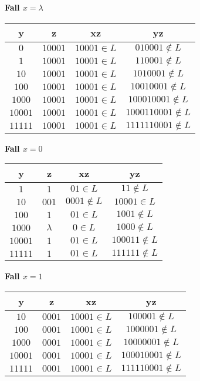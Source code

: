 
\textbf{Fall $x=\lambda$}
\begin{center}

\begin{tabular}[h]{c|c|c|c}
      \textbf{y} & \textbf{z} & \textbf{xz} & \textbf{yz} \\
      \hline
$ 0$ & $10001$ & $10001 \in L$ & $ 010001 \not\in L$ \\
$ 1$ & $10001$ & $10001 \in L$ & $ 110001 \not\in L$ \\
$ 10$ & $10001$ & $10001 \in L$ & $ 1010001 \not\in L$ \\
$ 100$ & $10001$ & $10001 \in L$ & $ 10010001 \not\in L$ \\
$ 1000 $ & $10001$ & $10001 \in L$ & $ 1000 10001 \not\in L$ \\
$ 10001$ & $10001$ & $10001 \in L$ & $ 1000110001 \not\in L$ \\
$ 11111$ & $10001$ & $10001 \in L$ & $ 1111110001 \not\in L$
\end{tabular}
\end{center}



\textbf{Fall $x= 0$}
\begin{center}

\begin{tabular}[h]{c|c|c|c}
      \textbf{y} & \textbf{z} & \textbf{xz} & \textbf{yz} \\
      \hline
$ 1$ & $1$ & $ 01 \in L$ & $ 11 \not\in L$ \\
$ 10$ & $001$ & $ 0001 \not\in L$ & $ 10001 \in L$ \\
$ 100$ & $1$ & $ 01 \in L$ & $ 1001 \not\in L$ \\
$ 1000 $ & $\lambda$ & $ 0 \in L$ & $ 1000 \not\in L$ \\
$ 10001$ & $1$ & $ 01 \in L$ & $ 100011 \not\in L$ \\
$ 11111$ & $1$ & $ 01 \in L$ & $ 111111 \not\in L$
\end{tabular}
\end{center}



\textbf{Fall $x= 1$}
\begin{center}

\begin{tabular}[h]{c|c|c|c}
      \textbf{y} & \textbf{z} & \textbf{xz} & \textbf{yz} \\
      \hline
$ 10$ & $0001$ & $ 10001 \in L$ & $ 100001 \not\in L$ \\
$ 100$ & $0001$ & $ 10001 \in L$ & $ 1000001 \not\in L$ \\
$ 1000 $ & $0001$ & $ 10001 \in L$ & $ 1000 0001 \not\in L$ \\
$ 10001$ & $0001$ & $ 10001 \in L$ & $ 100010001 \not\in L$ \\
$ 11111$ & $0001$ & $ 10001 \in L$ & $ 111110001 \not\in L$
\end{tabular}
\end{center}



